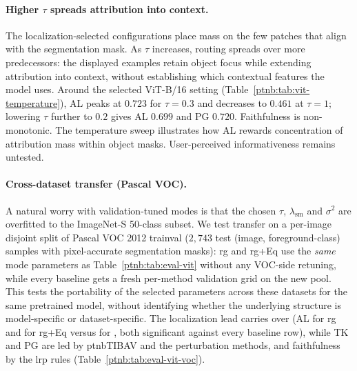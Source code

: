 \paragraph{Higher $\tau$ spreads attribution into context.}
The localization-selected configurations place mass on the few patches that align with the segmentation mask. As $\tau$ increases, routing spreads over more predecessors: the displayed examples retain object focus while extending attribution into context, without establishing which contextual features the model uses. Around the selected ViT-B/16 setting (Table~\ref{ptnb:tab:vit-temperature}), AL peaks at $0.723$ for $\tau{=}0.3$ and decreases to $0.461$ at $\tau{=}1$; lowering $\tau$ further to $0.2$ gives AL $0.699$ and PG $0.720$. Faithfulness is non-monotonic. The temperature sweep illustrates how AL rewards concentration of attribution mass within object masks. User-perceived informativeness remains untested.




\begin{table}[htbp]
    \centering
    \caption[ViT-B/16 Routing Game attention rule ablation]{\ac{vit}-B/16, \ac{rg}: attention ablation on 565 ImageNet-S test images at the anchor and validation-selected settings. Cells: gradient fallback above; composite Value rule (Theorem~\ref{ptnb:thm:attn-ab-recovery}, gray) below. Configurations: Section~\ref{ptnb:app:config-symbols}. $^{\dagger}$: paired bootstrap (McNemar for PG), Holm-corrected over the table, $p<0.05$.}
    \label{ptnb:tab:abl-gradient-fallback}
%
\end{table}

\paragraph{Cross-dataset transfer (Pascal VOC).}
A natural worry with validation-tuned modes is that the chosen $\tau$, $\lambda_{\mathrm{sm}}$ and
$\sigma^2$ are overfitted to the ImageNet-S 50-class subset. We test transfer on a per-image
disjoint split of Pascal VOC 2012 trainval ($2{,}743$ test (image, foreground-class) samples with
pixel-accurate segmentation masks): \ac{rg} and \ac{rg}+Eq use the \emph{same} mode parameters as
Table~\ref{ptnb:tab:eval-vit} without any VOC-side retuning, while every baseline gets a fresh
per-method validation grid on the new pool. This tests the portability of the selected parameters
across these datasets for the same pretrained model, without identifying whether the underlying
structure is model-specific or dataset-specific. The localization lead carries over (AL
\vocRGlocAL{} for \ac{rg} and \vocRGEqlocAL{} for \ac{rg}+Eq versus \vocBestBaseAL{} for
\vocBestBaseALname{}, both significant against every baseline row), while TK and PG are led by
\ac{ptnbTIBAV} and the perturbation methods, and faithfulness by the \ac{lrp} rules
(Table~\ref{ptnb:tab:eval-vit-voc}).

